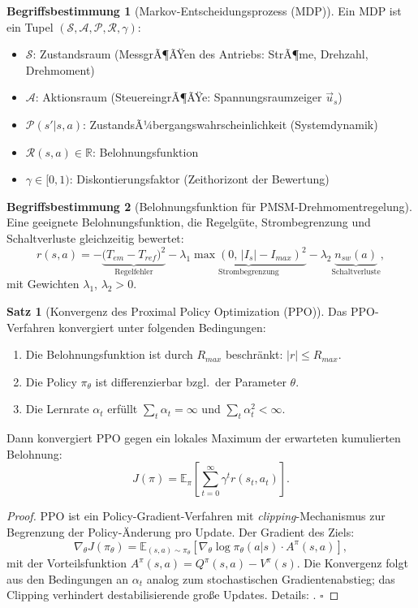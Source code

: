 ﻿\documentclass[a4paper,12pt,openany,oneside]{book}
\theoremstyle{definition}
\newtheorem{definition}{Begriffsbestimmung}[chapter]
\newtheorem{satz}{Satz}[chapter]
\begin{document}
\begin{definition}[Markov-Entscheidungsprozess (MDP)]
  Ein MDP ist ein Tupel $(\mathcal{S}, \mathcal{A}, \mathcal{P}, \mathcal{R}, \gamma)$:
  \begin{itemize}
    \item $\mathcal{S}$: Zustandsraum (MessgrÃ¶ÃŸen des Antriebs: StrÃ¶me, Drehzahl, Drehmoment)
    \item $\mathcal{A}$: Aktionsraum (SteuereingrÃ¶ÃŸe: Spannungsraumzeiger $\vec{u}_s$)
    \item $\mathcal{P}(s'|s,a)$: ZustandsÃ¼bergangswahrscheinlichkeit (Systemdynamik)
    \item $\mathcal{R}(s,a) \in \mathbb{R}$: Belohnungsfunktion
    \item $\gamma \in [0, 1)$: Diskontierungsfaktor (Zeithorizont der Bewertung)
  \end{itemize}
\end{definition}

\begin{definition}[Belohnungsfunktion f\"ur PMSM-Drehmomentregelung]
  Eine geeignete Belohnungsfunktion, die Regelg\"ute, Strombegrenzung und Schaltverluste
  gleichzeitig bewertet:
  \[
    r(s, a) = -\underbrace{\bigl(T_{em} - T_{ref}\bigr)^2}_{\text{Regelfehler}}
      - \lambda_1 \underbrace{\max(0,\, |I_s| - I_{max})^2}_{\text{Strombegrenzung}}
      - \lambda_2 \underbrace{n_{sw}(a)}_{\text{Schaltverluste}},
  \]
  mit Gewichten $\lambda_1$, $\lambda_2 > 0$.
\end{definition}

\begin{satz}[Konvergenz des Proximal Policy Optimization (PPO)]
  Das PPO-Verfahren konvergiert unter folgenden Bedingungen:
  \begin{enumerate}
    \item Die Belohnungsfunktion ist durch $R_{max}$ beschr\"ankt: $|r| \leq R_{max}$.
    \item Die Policy $\pi_\theta$ ist differenzierbar bzgl.\ der Parameter $\theta$.
    \item Die Lernrate $\alpha_t$ erf\"ullt $\sum_t \alpha_t = \infty$ und $\sum_t \alpha_t^2 < \infty$.
  \end{enumerate}
  Dann konvergiert PPO gegen ein lokales Maximum der erwarteten kumulierten Belohnung:
  \[
    J(\pi) = \mathbb{E}_{\pi}\!\left[\sum_{t=0}^{\infty}\gamma^t r(s_t, a_t)\right].
  \]
\end{satz}

\begin{proof}
  PPO ist ein Policy-Gradient-Verfahren mit \emph{clipping}-Mechanismus zur Begrenzung
  der Policy-\"Anderung pro Update. Der Gradient des Ziels:
  \[
    \nabla_\theta J(\pi_\theta) = \mathbb{E}_{(s,a)\sim\pi_\theta}\!
    \left[\nabla_\theta \log\pi_\theta(a|s) \cdot A^\pi(s,a)\right],
  \]
  mit der Vorteilsfunktion $A^\pi(s,a) = Q^\pi(s,a) - V^\pi(s)$.
  Die Konvergenz folgt aus den Bedingungen an $\alpha_t$ analog zum stochastischen
  Gradientenabstieg; das Clipping verhindert destabilisierende gro\ss{}e Updates.
  Details: \cite{Schulman2017}. \qquad$\square$
\end{proof}
\end{document}
